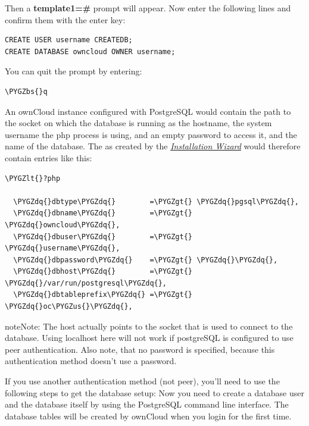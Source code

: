 \documentclass[letterpaper,10pt,english]{sphinxmanual}
\def\PYGZbs{\char`\\}
\def\PYGZus{\char`\_}
\def\PYGZlt{\char`\<}
\def\PYGZgt{\char`\>}
\def\PYGZdq{\char`\"}
\begin{document}
Then a \textbf{template1=\#} prompt will appear. Now enter the following lines and confirm them with the enter key:

\begin{Verbatim}[commandchars=\\\{\}]
CREATE USER username CREATEDB;
CREATE DATABASE owncloud OWNER username;
\end{Verbatim}

You can quit the prompt by entering:

\begin{Verbatim}[commandchars=\\\{\}]
\PYGZbs{}q
\end{Verbatim}

An ownCloud instance configured with PostgreSQL would contain the path to the socket on
which the database is running as the hostname, the system username the php process is using,
and an empty password to access it, and the name of the database. The  as
created by the {\hyperref[installation/installation_wizard::doc]{\emph{Installation Wizard}}} would therefore contain entries like
this:

\begin{Verbatim}[commandchars=\\\{\}]
\PYGZlt{}?php

  \PYGZdq{}dbtype\PYGZdq{}        =\PYGZgt{} \PYGZdq{}pgsql\PYGZdq{},
  \PYGZdq{}dbname\PYGZdq{}        =\PYGZgt{} \PYGZdq{}owncloud\PYGZdq{},
  \PYGZdq{}dbuser\PYGZdq{}        =\PYGZgt{} \PYGZdq{}username\PYGZdq{},
  \PYGZdq{}dbpassword\PYGZdq{}    =\PYGZgt{} \PYGZdq{}\PYGZdq{},
  \PYGZdq{}dbhost\PYGZdq{}        =\PYGZgt{} \PYGZdq{}/var/run/postgresql\PYGZdq{},
  \PYGZdq{}dbtableprefix\PYGZdq{} =\PYGZgt{} \PYGZdq{}oc\PYGZus{}\PYGZdq{},
\end{Verbatim}

\begin{notice}{note}{Note:}
The host actually points to the socket that is used to connect to the database. Using localhost here will not work if postgreSQL is configured to use peer authentication. Also note, that no password is specified, because this authentication method doesn't use a password.
\end{notice}

If you use another authentication method (not peer), you'll need to use the following steps to get the database setup:
Now you need to create a database user and the database itself by using the
PostgreSQL command line interface. The database tables will be created by
ownCloud when you login for the first time.
\end{document}
